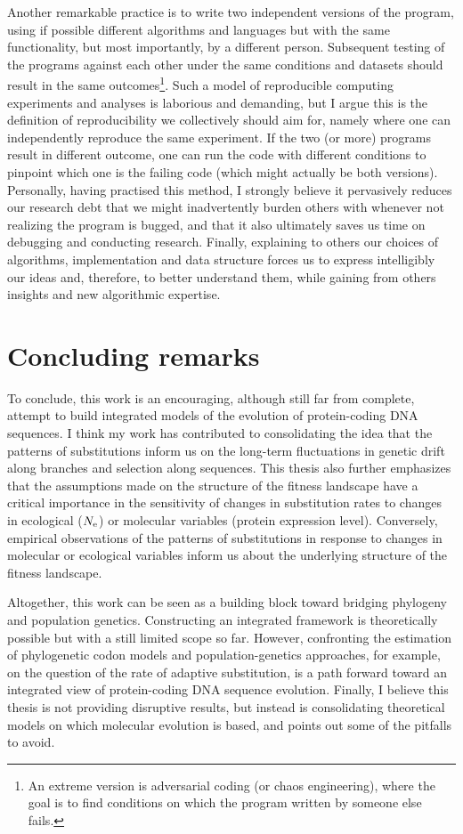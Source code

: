Another remarkable practice is to write two independent versions of the program, using if possible different algorithms and languages but with the same functionality, but most importantly, by a different person.
Subsequent testing of the programs against each other under the same conditions and datasets should result in the same outcomes\footnote{An extreme version is adversarial coding (or chaos engineering), where the goal is to find conditions on which the program written by someone else fails.}.
Such a model of reproducible computing experiments and analyses is laborious and demanding, but I argue this is the definition of reproducibility we collectively should aim for, namely where one can independently reproduce the same experiment.
If the two (or more) programs result in different outcome, one can run the code with different conditions to pinpoint which one is the failing code (which might actually be both versions).
Personally, having practised this method, I strongly believe it pervasively reduces our research debt that we might inadvertently burden others with whenever not realizing the program is bugged, and that it also ultimately saves us time on debugging and conducting research.
Finally, explaining to others our choices of algorithms, implementation and data structure forces us to express intelligibly our ideas and, therefore, to better understand them, while gaining from others insights and new algorithmic expertise.


\section{Concluding remarks}
\label{sec:concluding-remarks}

To conclude, this work is an encouraging, although still far from complete, attempt to build integrated models of the evolution of protein-coding \acrshort{DNA} sequences.
I think my work has contributed to consolidating the idea that the patterns of substitutions inform us on the long-term fluctuations in genetic drift along branches and selection along sequences.
This thesis also further emphasizes that the assumptions made on the structure of the fitness landscape have a critical importance in the sensitivity of changes in substitution rates to changes in ecological ($N_{\text{e}}$) or molecular variables (protein expression level).
Conversely, empirical observations of the patterns of substitutions in response to changes in molecular or ecological variables inform us about the underlying structure of the fitness landscape.

Altogether, this work can be seen as a building block toward bridging phylogeny and population genetics.
Constructing an integrated framework is theoretically possible but with a still limited scope so far.
However, confronting the estimation of phylogenetic codon models and population-genetics approaches, for example, on the question of the rate of adaptive substitution, is a path forward toward an integrated view of protein-coding DNA sequence evolution.
Finally, I believe this thesis is not providing disruptive results, but instead is consolidating theoretical models on which molecular evolution is based, and points out some of the pitfalls to avoid.
